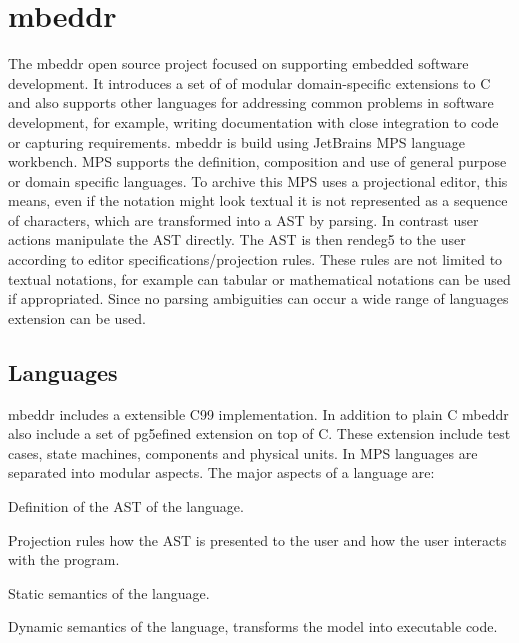 \section{mbeddr}


The mbeddr open source project focused on supporting embedded software development. It introduces a set of of modular domain-specific extensions to C and also supports other languages for addressing common problems in software development, for example, writing documentation with close integration to code or capturing requirements. mbeddr is build using JetBrains \ac{MPS} language workbench. \ac{MPS} supports the definition, composition and use of general purpose or domain specific languages. To archive this \ac{MPS} uses a projectional editor, this means, even if the notation might look textual it is not represented as a sequence of characters, which are transformed into a \ac{AST} by parsing. In contrast user actions manipulate the \ac{AST} directly. The \ac{AST} is then rendeg5 to the user according to editor specifications/projection rules. These rules are not limited to textual notations, for example can tabular or mathematical notations can be used if appropriated. Since no parsing ambiguities can occur a wide range of languages extension can be used.


\subsection{Languages}
\label{languageImplementation}
mbeddr includes a extensible C99 implementation. In addition to plain C mbeddr also include a set of pg5efined extension on top of C. These extension include test cases, state machines, components and physical units. In \ac{MPS} languages are separated into modular aspects. The major aspects of a language are:  

 Definition of the \ac{AST} of the language.

 Projection rules how the \ac{AST} is presented to the user and how the user interacts with the program.

 Static semantics of the language.
 
 Dynamic semantics of the language, transforms the model into executable code.


